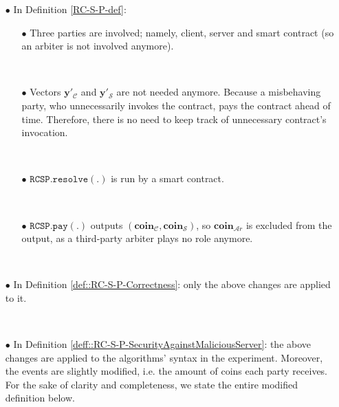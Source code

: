 \begin{itemize}

\item[$\bullet$] In Definition \ref{RC-S-P-def}: 
\begin{itemize}

\item [$\bullet$]  Three parties are involved; namely, client, server and smart contract (so an arbiter is not involved anymore). 

\

\item [$\bullet$]  Vectors $\bm{y}'_{\scriptscriptstyle\mathcal{C}}$ and $\bm{y}'_{\scriptscriptstyle\mathcal{S}}$ are not needed anymore. Because a misbehaving party, who unnecessarily invokes the contract, pays the contract ahead of time. Therefore, there is no need to keep track of unnecessary contract's invocation. 




\

\item [$\bullet$] $\mathtt{RCSP}.\mathtt{resolve}(.)$ is run by a smart contract. 

\

\item [$\bullet$] $\mathtt{RCSP}.\mathtt{pay}(.)$ outputs $({\bm{coin}}_{\scriptscriptstyle\mathcal C},{\bm{coin}}_{\scriptscriptstyle\mathcal S})$, so ${\bm{coin}}_{\scriptscriptstyle\mathcal{A}r}$ is excluded from the output, as a third-party arbiter plays no role anymore.
\end{itemize}

\

\item [$\bullet$] In Definition \ref{def::RC-S-P-Correctness}: only the above changes are applied to it. 

\

\item [$\bullet$] In Definition \ref{deff::RC-S-P-SecurityAgainstMaliciousServer}:  the above changes are applied to the algorithms' syntax in the experiment. Moreover, the events are slightly modified, i.e. the amount of coins each party receives. For the sake of clarity and completeness, we state the entire modified  definition below. 


\end{itemize}
